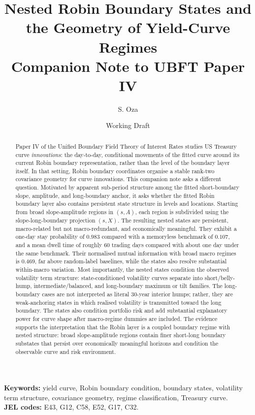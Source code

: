 \documentclass[11pt]{article}
\title{Nested Robin Boundary States and the Geometry of Yield-Curve Regimes\\
\large Companion Note to UBFT Paper IV}
\author{S. Oza}
\date{Working Draft}
\begin{document}
\maketitle


\begin{abstract}
Paper IV of the Unified Boundary Field Theory of Interest Rates \cite{batty-paper4} studies US Treasury curve \emph{innovations}: the day-to-day, conditional movements of the fitted curve around its current Robin boundary representation, rather than the level of the boundary layer itself. In that setting, Robin boundary coordinates organise a stable rank-two covariance geometry for curve innovations. This companion note asks a different question. Motivated by apparent sub-period structure among the fitted short-boundary slope, amplitude, and long-boundary anchor, it asks whether the fitted Robin boundary layer also contains persistent state structure in levels and locations. Starting from broad slope-amplitude regions in $(s,A)$, each region is subdivided using the slope-long-boundary projection $(s,X)$. The resulting nested states are persistent, macro-related but not macro-redundant, and economically meaningful. They exhibit a one-day stay probability of $0.983$ compared with a memoryless benchmark of $0.107$, and a mean dwell time of roughly 60 trading days compared with about one day under the same benchmark. Their normalised mutual information with broad macro regimes is $0.469$, far above random-label baselines, while the states also resolve substantial within-macro variation. Most importantly, the nested states condition the observed volatility term structure: state-conditioned volatility curves separate into short/belly-hump, intermediate/balanced, and long-boundary maximum or tilt families. The long-boundary cases are not interpreted as literal 30-year interior humps; rather, they are weak-anchoring states in which realised volatility is transmitted toward the long boundary. The states also condition portfolio risk and add substantial explanatory power for curve shape after macro-regime dummies are included. The evidence supports the interpretation that the Robin layer is a coupled boundary regime with nested structure: broad slope-amplitude regions contain finer short-long boundary substates that persist over economically meaningful horizons and condition the observable curve and risk environment.
\end{abstract}

\noindent\textbf{Keywords:} yield curve, Robin boundary condition, boundary states, volatility term structure, covariance geometry, regime classification, Treasury curve.\\
\textbf{JEL codes:} E43, G12, C58, E52, G17, C32.
\end{document}
